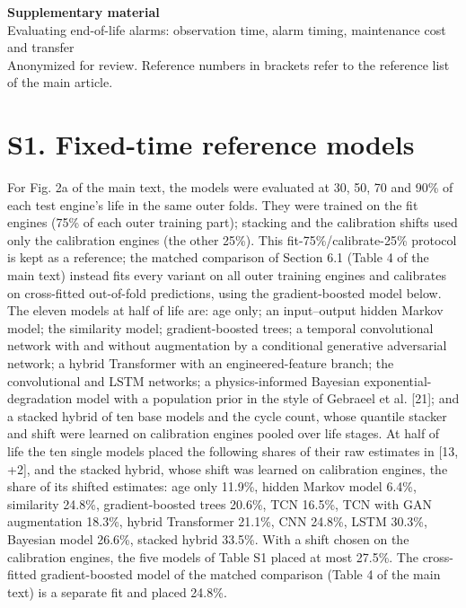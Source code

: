 \documentclass[11pt,a4paper]{article}
\begin{document}
\begin{center}{\Large\bfseries Supplementary material}\\[6pt]{\large Evaluating end-of-life alarms: observation time, alarm timing, maintenance cost and transfer}\\[6pt]{\small Anonymized for review. Reference numbers in brackets refer to the reference list of the main article.}\end{center}
\section*{S1. Fixed-time reference models}

\noindent For Fig. 2a of the main text, the models were evaluated at 30, 50, 70 and 90\% of each test engine's life in the same outer folds. They were trained on the fit engines (75\% of each outer training part); stacking and the calibration shifts used only the calibration engines (the other 25\%). This fit-75\%/calibrate-25\% protocol is kept as a reference; the matched comparison of Section 6.1 (Table 4 of the main text) instead fits every variant on all outer training engines and calibrates on cross-fitted out-of-fold predictions, using the gradient-boosted model below. The eleven models at half of life are: age only; an input--output hidden Markov model; the similarity model; gradient-boosted trees; a temporal convolutional network with and without augmentation by a conditional generative adversarial network; a hybrid Transformer with an engineered-feature branch; the convolutional and LSTM networks; a physics-informed Bayesian exponential-degradation model with a population prior in the style of Gebraeel et al. [21]; and a stacked hybrid of ten base models and the cycle count, whose quantile stacker and shift were learned on calibration engines pooled over life stages. At half of life the ten single models placed the following shares of their raw estimates in [\textminus{}13, +2], and the stacked hybrid, whose shift was learned on calibration engines, the share of its shifted estimates: age only 11.9\%, hidden Markov model 6.4\%, similarity 24.8\%, gradient-boosted trees 20.6\%, TCN 16.5\%, TCN with GAN augmentation 18.3\%, hybrid Transformer 21.1\%, CNN 24.8\%, LSTM 30.3\%, Bayesian model 26.6\%, stacked hybrid 33.5\%. With a shift chosen on the calibration engines, the five models of Table S1 placed at most 27.5\%. The cross-fitted gradient-boosted model of the matched comparison (Table 4 of the main text) is a separate fit and placed 24.8\%.
\end{document}
